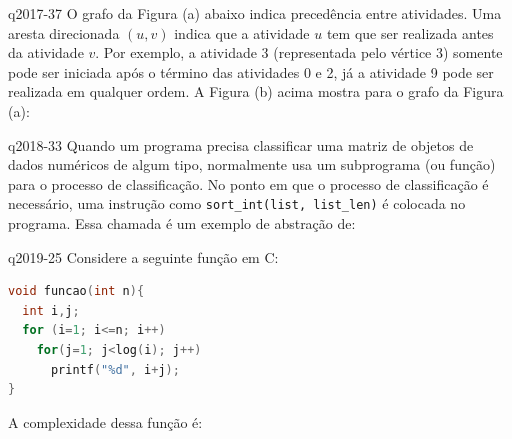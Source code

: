 \documentclass[10pt,a4paper]{article}
\begin{document}
{
\def\AMCbeginQuestion#1#2{\par\noindent{\bf (POSCOMP 2017 - Questão 37)}}
\begin{question}{q2017-37} O grafo da Figura (a) abaixo indica precedência entre atividades. Uma aresta direcionada $(u,v)$ indica que a atividade $u$ tem que ser realizada antes da atividade $v$. Por exemplo, a atividade 3 (representada pelo vértice 3) somente pode ser iniciada após o término das atividades 0 e 2, já a atividade 9 pode ser realizada em qualquer ordem. A Figura (b) acima mostra para o grafo da Figura (a):
\begin{choices}
\end{choices}
\end{question}
}

{
\def\AMCbeginQuestion#1#2{\par\noindent{\bf (POSCOMP 2018 - Questão 33)}}
\begin{question}{q2018-33} Quando um programa precisa classificar uma matriz de objetos de dados numéricos de algum tipo, normalmente usa um subprograma (ou função) para o processo de classificação. No ponto em que o processo de classificação é necessário, uma instrução como \texttt{sort\_int(list, list\_len)} é colocada no programa. Essa chamada é um exemplo de abstração de:
\begin{choices}
\end{choices}
\end{question}
}

{
\def\AMCbeginQuestion#1#2{\par\noindent{\bf (POSCOMP 2019 - Questão 25)}}
\begin{question}{q2019-25} Considere a seguinte função em C:
\begin{lstlisting}[language=C]
void funcao(int n){
  int i,j;
  for (i=1; i<=n; i++)
    for(j=1; j<log(i); j++)
      printf("%d", i+j);
}
\end{lstlisting}
A complexidade dessa função é:
\begin{choices}
\end{choices}
\end{question}
}
\end{document}
